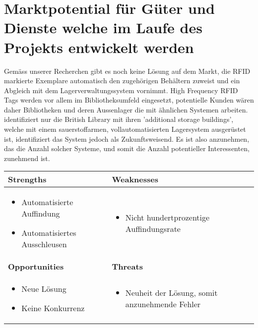 \chapter{Marktpotential für Güter und Dienste welche im Laufe des Projekts entwickelt werden}

Gemäss unserer Recherchen gibt es noch keine Lösung auf dem Markt, die RFID markierte Exemplare automatisch den zugehörigen Behältern zuweist und ein Abgleich mit dem Lagerverwaltungssystem vornimmt. High Frequency RFID Tags werden vor allem im Bibliotheksumfeld eingesetzt, potentielle Kunden wären daher Bibliotheken und deren Aussenlager die mit ähnlichen Systemen arbeiten. \citeauthor{Niederer2017} identifiziert nur die British Library mit ihren 'additional storage buildings', welche mit einem sauerstoffarmen, vollautomatisierten Lagersystem ausgerüstet ist, identifiziert das System jedoch als Zukunftsweisend. Es ist also anzunehmen, das die Anzahl solcher Systeme, und somit die Anzahl potentieller Interessenten, zunehmend ist.

\begin{table}[h!]
	\centering
	\begin{tabularx}{\textwidth}{|X|X|}
		\hline
		\textbf{Strengths} & \textbf{Weaknesses} \\
		\hline
		\begin{itemize}[noitemsep]
			\item Automatisierte Auffindung
			\item Automatisiertes Ausschleusen
		\end{itemize} & \begin{itemize}[noitemsep]
			\item Nicht hundertprozentige Auffindungsrate
		\end{itemize}
		\\
		\hline
		\textbf{Opportunities} & \textbf{Threats} \\
		\hline
		\begin{itemize}[noitemsep]
			\item Neue Lösung
			\item Keine Konkurrenz
		\end{itemize} & \begin{itemize}[noitemsep]
			\item Neuheit der Lösung, somit anzunehmende Fehler
		\end{itemize}
		\\
		\hline
	\end{tabularx}
\end{table}

